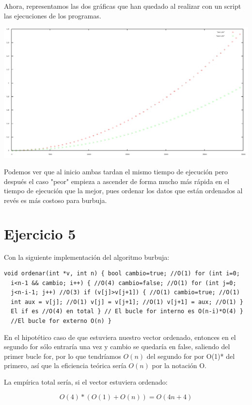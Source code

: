 \documentclass[11pt]{article}
\begin{document}
Ahora, representamos las dos gráficas que han quedado al realizar con
un script las ejecuciones de los programas.


\includegraphics[scale=0.25]{MP.png}

Podemos ver que al inicio ambas tardan el mismo tiempo de ejecución
pero después el caso "peor" empieza a ascender de forma mucho más
rápida en el tiempo de ejecución que la mejor, pues ordenar los datos
que están ordenados al revés es más costoso para burbuja.

\section*{Ejercicio 5}
\label{sec-5}

Con la siguiente implementación del algoritmo burbuja:

\begin{verbatim}
void ordenar(int *v, int n) { bool cambio=true; //O(1) for (int i=0;
  i<n-1 && cambio; i++) { //O(4) cambio=false; //O(1) for (int j=0;
  j<n-i-1; j++) //O(3) if (v[j]>v[j+1]) { //O(1) cambio=true; //O(1)
  int aux = v[j]; //O(1) v[j] = v[j+1]; //O(1) v[j+1] = aux; //O(1) }
  El if es //O(4) en total } // El bucle for interno es O(n-i)*O(4) }
  //El bucle for externo O(n) }
\end{verbatim}

En el hipotético caso de que estuviera nuestro vector ordenado,
entonces en el segundo for sólo entraría una vez y cambio se quedaría
en false, saliendo del primer bucle for, por lo que tendríamos $O(n)$
del segundo for por O(1)* del primero, así que la eficiencia teórica
sería $O(n)$ por la notación O.

La empírica total sería, si el vector estuviera ordenado:

\[ O(4)*(O(1)+O(n)) = O(4n + 4) \]
\end{document}
